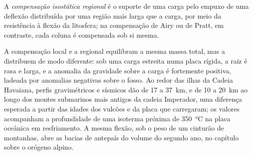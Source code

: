 \begin{definition}\label{def:b3:gravity-geodesy:regional}
A \emph{compensação isostática regional}
é o suporte de uma carga pelo empuxo de uma deflexão distribuída por uma região
mais larga que a carga, por meio da resistência à flexão da litosfera; na
compensação de Airy ou de Pratt, em contraste, cada coluna é compensada sob si mesma.
\end{definition}

A compensação local e a regional equilibram a mesma massa total, mas a distribuem
de modo diferente: sob uma carga estreita numa placa rígida, a raiz é rasa e larga,
e a anomalia da gravidade sobre a carga é fortemente positiva, ladeada por
anomalias negativas sobre o fosso. Ao redor das ilhas da Cadeia Havaiana, perfis gravimétricos e
sísmicos dão  de 17 a \qty{37}{km}, e
de 10 a \qty{20}{km} ao longo dos montes submarinos mais antigos da cadeia Imperador, uma diferença
esperada a partir das idades dos vulcões e da placa que carregaram; os valores
acompanham a profundidade de uma isoterma próxima de
\qty{350}{\degreeCelsius} na placa oceânica em resfriamento.
A mesma flexão, sob o peso de um cinturão de montanhas, abre as bacias de
antepaís do volume do segundo ano, no capítulo sobre o orógeno alpino.

